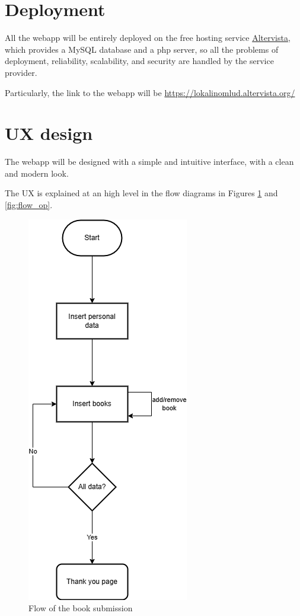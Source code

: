 

\section{Deployment}

All the webapp will be entirely deployed on the free hosting service \href{www.altervista.org}{Altervista}, which provides a MySQL database and a php server, so all the problems of deployment, reliability, scalability, and security are handled by the service provider.

Particularly, the link to the webapp will be \url{https://lokalinomlud.altervista.org/}

\section{UX design}

The webapp will be designed with a simple and intuitive interface, with a clean and modern look.

The UX is explained at an high level in the flow diagrams in Figures \ref{fig:flow_book_submission} and \ref{fig:flow_op}.

\begin{figure}[ht]
    \centering
    \includegraphics[width=.25\textwidth]{assets/flow_book_submission.png}
    \caption{Flow of the book submission}
    \label{fig:flow_book_submission}
\end{figure}

